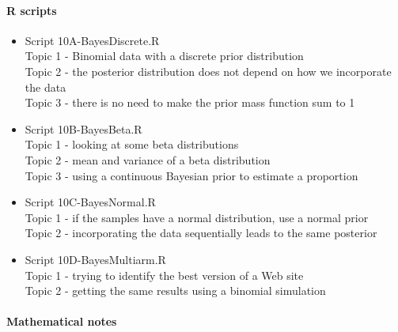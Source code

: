 \documentclass[12pt]{article}
\begin{document}
\paragraph*{R scripts}
\begin{itemize}
\item Script 10A-BayesDiscrete.R\\
Topic 1 - Binomial data with a discrete prior distribution\\
Topic 2 - the posterior distribution does not depend on how we incorporate the data\\
Topic 3 - there is no need to make the prior mass function sum to 1\\

\item Script 10B-BayesBeta.R\\
Topic 1 - looking at some beta distributions\\
Topic 2 - mean and variance of a beta distribution\\
Topic 3 - using a continuous Bayesian prior to estimate a proportion\\

\item Script 10C-BayesNormal.R\\
Topic 1 - if the samples have a normal distribution, use a normal prior\\
Topic 2 - incorporating the data sequentially leads to the same posterior\\

\item Script 10D-BayesMultiarm.R\\
Topic 1 - trying to identify the best version of a Web site\\
Topic 2 - getting the same results using a binomial simulation\\











\end{itemize}

\pagebreak





\paragraph*{Mathematical notes}
\end{document}
